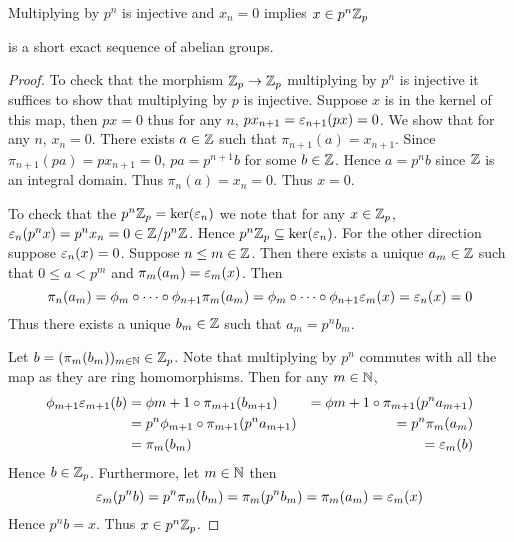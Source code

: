 \begin{prop}
    Multiplying by $p^n$ is injective 
    and $x_n = 0$ implies $x \in p^n \mathbb{Z}_p$
    \begin{center}\end{center}
    is a short exact sequence of abelian groups.
\end{prop}
\begin{proof}
    To check that the morphism $\mathbb{Z}_p \to \mathbb{Z}_p$ 
    multiplying by $p^n$ is injective
    it suffices to show that multiplying by $p$ is 
    injective.
    Suppose $x$ is in the kernel of this map, 
    then $px = 0$ thus for any $n$, 
    $p x_{n+1} = \varepsilon_{n+1}(px) = 0$.
    We show that for any $n$, $x_n = 0$.
    There exists $a \in \mathbb{Z}$ such that
    $\pi_{n+1} (a)= x_{n+1}$.
    Since $\pi_{n+1}(pa) = p x_{n+1} = 0$,
    $pa = p^{n+1} b$ for some $b \in \mathbb{Z}$.
    Hence $a = p^n b$ since $\mathbb{Z}$ is an integral domain.
    Thus $\pi_n (a) = x_n = 0$.
    Thus $x = 0$.

    To check that the $p^n \mathbb{Z}_p = \ker(\varepsilon_n)$
    we note that for any $x \in \mathbb{Z}_p$, 
    $\varepsilon_n (p^n x) = p^n x_n = 0 \in \mathbb{Z}/p^{n}\mathbb{Z}$.
    Hence $p^n \mathbb{Z}_p \subseteq \ker(\varepsilon_n)$.
    For the other direction suppose $\varepsilon_n(x)= 0$.
    Suppose $n \le m \in \mathbb{Z}$.
    Then there exists a unique $a_m \in \mathbb{Z}$ such that $0 \le a < p^m$
    and $\pi_m (a_m) = \varepsilon_m(x)$.
    Then 
    \[\pi_n (a_m) = \phi_m \circ \cdots \circ \phi_{n+1} \pi_m (a_m) = 
    \phi_m \circ \cdots \circ \phi_{n+1} \varepsilon_m (x) = \varepsilon_n (x) = 0\]
    Thus there exists a unique $b_m \in \mathbb{Z}$ such that $a_m = p^n b_m$.
    
    Let $b = (\pi_m(b_m))_{m \in \mathbb{N}} \in \mathbb{Z}_p$.
    Note that multiplying by $p^n$ commutes with all the map
    as they are ring homomorphisms.
    Then for any $m \in \mathbb{N}$,
    \begin{align*}
        \phi_{m+1} \varepsilon_{m+1}(b) &= \phi{m+1} \circ \pi_{m+1} (b_{m+1})
        &= \phi{m+1} \circ \pi_{m+1} (p^n a_{m+1})\\
        &= p^n \phi_{m+1} \circ \pi_{m+1} (p^n a_{m+1})
        &= p^n \pi_m (a_m) \\
        &= \pi_m(b_m) &= \varepsilon_m(b)
    \end{align*}
    Hence $b \in \mathbb{Z}_p$.
    Furthermore, 
    let $m \in \mathbb{N}$ then
    \[ \varepsilon_m(p^n b) = p^n \pi_m (b_m) = \pi_m (p^n b_m) = 
    \pi_m (a_m) = \varepsilon_m(x)\]
    Hence $p^n b = x$.
    Thus $x \in p^n \mathbb{Z}_p$.
\end{proof}

